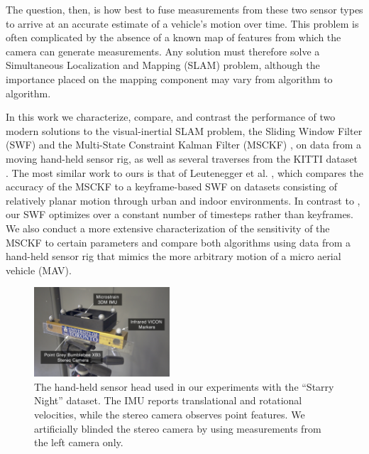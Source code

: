 \documentclass[letterpaper, 10 pt, conference]{ieeeconf}  %
\begin{document}
The question, then, is how best to fuse measurements from these two sensor types to arrive at an accurate estimate of a vehicle's motion over time.
This problem is often complicated by the absence of a known map of features from which the camera can generate measurements.
Any solution must therefore solve a Simultaneous Localization and Mapping (SLAM) problem, although the importance placed on the mapping component may vary from algorithm to algorithm.

In this work we characterize, compare, and contrast the performance of two modern solutions to the visual-inertial SLAM problem, the Sliding Window Filter (SWF) and the Multi-State Constraint Kalman Filter (MSCKF) \cite{Mourikis:2006:TechReport,Mourikis:2007:ICRA}, on data from a moving hand-held sensor rig, as well as several traverses from the KITTI dataset \cite{Geiger:2013:IJRR}.
The most similar work to ours is that of Leutenegger et al. \cite{Leutenegger:2015:IJRR}, which compares the accuracy of the MSCKF to a keyframe-based SWF on datasets consisting of relatively planar motion through urban and indoor environments.
In contrast to \cite{Leutenegger:2015:IJRR}, our SWF optimizes over a constant number of timesteps rather than keyframes.
We also conduct a more extensive characterization of the sensitivity of the MSCKF to certain parameters and compare both algorithms using data from a hand-held sensor rig that mimics the more arbitrary motion of a micro aerial vehicle (MAV).

\begin{figure}[t]
    \vspace{0.25cm}
    \centering
    \includegraphics[width=0.45\textwidth]{figs/sensorhead}
    \caption{The hand-held sensor head used in our experiments with the ``Starry Night'' dataset. The IMU reports translational and rotational velocities, while the stereo camera observes point features. We artificially blinded the stereo camera by using measurements from the left camera only.}
    \label{fig:sensorhead}
\end{figure}

\end{document}
